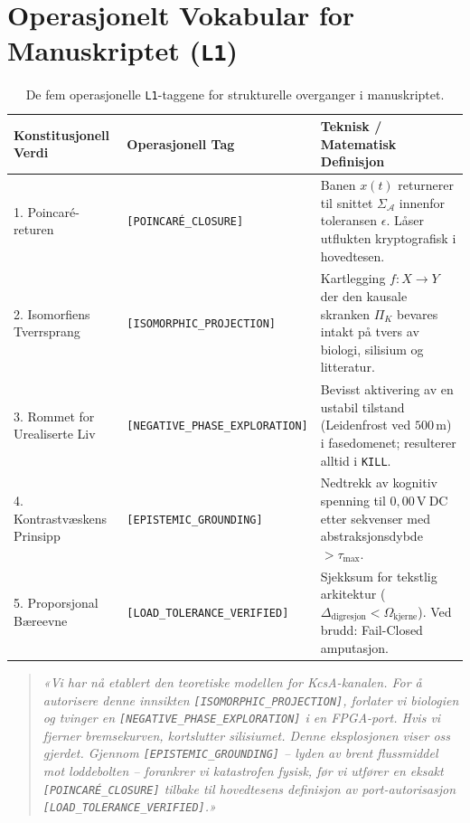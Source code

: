 \documentclass[11pt,a4paper,oneside]{book}
\theoremstyle{definition}
\begin{document}
\section{Operasjonelt Vokabular for Manuskriptet (\texttt{L1})}

\begin{table}[h!]
\centering
\small
\begin{tabularx}{\textwidth}{llX}
\toprule
\textbf{Konstitusjonell Verdi} & \textbf{Operasjonell Tag} & \textbf{Teknisk / Matematisk Definisjon} \\
\midrule
1. Poincaré-returen & \texttt{[POINCARÉ\_CLOSURE]} & Banen $x(t)$ returnerer til snittet $\Sigma_{\mathcal{A}}$ innenfor toleransen $\epsilon$. Låser utflukten kryptografisk i hovedtesen. \\
2. Isomorfiens Tverrsprang & \texttt{[ISOMORPHIC\_PROJECTION]} & Kartlegging $f: X \to Y$ der den kausale skranken $\Pi_K$ bevares intakt på tvers av biologi, silisium og litteratur. \\
3. Rommet for Urealiserte Liv & \texttt{[NEGATIVE\_PHASE\_EXPLORATION]} & Bevisst aktivering av en ustabil tilstand (Leidenfrost ved $500\,\mathrm{m}$) i fasedomenet; resulterer alltid i \texttt{KILL}. \\
4. Kontrastvæskens Prinsipp & \texttt{[EPISTEMIC\_GROUNDING]} & Nedtrekk av kognitiv spenning til $0{,}00\,\mathrm{V\ DC}$ etter sekvenser med abstraksjonsdybde $> \tau_{\max}$. \\
5. Proporsjonal Bæreevne & \texttt{[LOAD\_TOLERANCE\_VERIFIED]} & Sjekksum for tekstlig arkitektur ($\Delta_{\mathrm{digresjon}} < \Omega_{\mathrm{kjerne}}$). Ved brudd: Fail-Closed amputasjon. \\
\bottomrule
\end{tabularx}
\caption{De fem operasjonelle \texttt{L1}-taggene for strukturelle overganger i manuskriptet.}
\end{table}

\begin{quote}
\itshape
«Vi har nå etablert den teoretiske modellen for KcsA-kanalen. For å autorisere denne innsikten \texttt{[ISOMORPHIC\_PROJECTION]}, forlater vi biologien og tvinger en \texttt{[NEGATIVE\_PHASE\_EXPLORATION]} i en FPGA-port. Hvis vi fjerner bremsekurven, kortslutter silisiumet. Denne eksplosjonen viser oss gjerdet. Gjennom \texttt{[EPISTEMIC\_GROUNDING]} -- lyden av brent flussmiddel mot loddebolten -- forankrer vi katastrofen fysisk, før vi utfører en eksakt \texttt{[POINCARÉ\_CLOSURE]} tilbake til hovedtesens definisjon av port-autorisasjon \texttt{[LOAD\_TOLERANCE\_VERIFIED]}.»
\end{quote}
\end{document}
